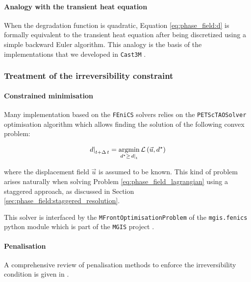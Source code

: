 \paragraph{Analogy with the transient heat equation}

When the degradation function is quadratic, Equation
\eqref{eq:phase_field:d} is formally equivalent to the
transient heat equation after being discretized
using a simple backward Euler algorithm.
This analogy is the basis of the implementations that we developed
in \texttt{Cast3M}
\cite{helfer_modelisation_2017, helfer_phase-field_2018, lu_schema_2019}.

\subsubsection{Treatment of the irreversibility constraint}

\paragraph{Constrained minimisation}

Many implementation based on the \texttt{FEniCS} solvers
\cite{alessi_gradient_2015, crabbe_etudes_2017, farrell_linear_2017, bleyer_phase-field_2020}
relies on the \texttt{PETScTAOSolver} optimisation algorithm which allows
finding the solution of the following convex problem:

\[
  \left.d\right|_{t+\Delta\,t} = \underset{d^{\star}\geq\left.d\right|_{t}}{\mathrm{argmin}{}}\, \mathcal{L}\left(\vec{u},d^{\star}\right)
\]

where the displacement field \(\vec{u}\) is assumed to be known. This
kind of problem arises naturally when solving Problem
\eqref{eq:phase_field_lagrangian} using a staggered approach, as discussed in
Section \ref{sec:phase_field:staggered_resolution}.

This solver is interfaced by the \texttt{MFrontOptimisationProblem} of the
\texttt{mgis.fenics} python module
\cite{bleyer_overview_2020, bleyer_phase-field_2020} which is part of the
\texttt{MGIS} project \cite{helfer_mfrontgenericinterfacesupport_2020}.

\paragraph{Penalisation}

A comprehensive review of penalisation methods to enforce the
irreversibility condition is given in \cite{gerasimov_penalization_2019}.

